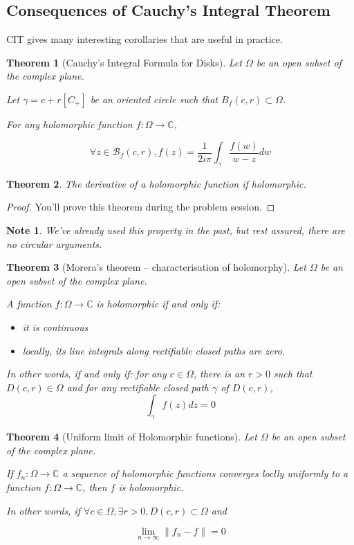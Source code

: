 \documentclass{article}
\newtheorem*{note}{Note}
\newtheorem*{thm*}{Theorem}
\begin{document}
\subsection*{Consequences of Cauchy's Integral Theorem}
CIT gives many interesting corollaries that are useful in practice.


\begin{thm*}[Cauchy's Integral Formula for Disks]
    Let $\Omega$ be an open subset of the complex plane. 

    Let $\gamma = c + r[C_+]$ be an oriented circle such that $B_f(c, r) \subset \Omega$.

    For any holomorphic function $f: \Omega \rightarrow \mathbb{C}$, 

    $$\forall z\in\mathcal{B}_f(c, r), f(z) = \frac{1}{2i\pi}\int_\gamma \frac{f(w)}{w - z}dw$$
\end{thm*}


\begin{thm*}
    The derivative of a holomorphic function if holomorphic.
\end{thm*}

\begin{proof}
    You'll prove this theorem during the problem session.
\end{proof}

\begin{note}
    We've already used this property in the past, but rest assured, there are no circular arguments.
\end{note}

\begin{thm*}[Morera's theorem -- characterisation of holomorphy]
    Let $\Omega$ be an open subset of the complex plane. 

    A function $f: \Omega \rightarrow \mathbb{C}$ is holomorphic if and only if:

    \begin{itemize}
        \item it is continuous
        \item locally, its line integrals along rectifiable closed paths are zero.
    \end{itemize}

    In other words, if and only if: for any $c\in\Omega$, there is an $r > 0$ such that $D(c, r) \in \Omega$ and for any rectifiable closed path $\gamma$ of $D(c,r)$,
    $$\int_\gamma f(z)dz = 0 $$
\end{thm*}

\begin{thm*}[Uniform limit of Holomorphic functions]
    Let $\Omega$ be an open subset of the complex plane. 

    If $f_n: \Omega \rightarrow \mathbb{C}$ a sequence of holomorphic functions converges loclly uniformly to a function $f: \Omega \rightarrow \mathbb{C}$, then $f$ is holomorphic.

    In other words, if $\forall c\in\Omega, \exists r > 0, D(c,r) \subset \Omega$ and 

    $$ \lim_{n\rightarrow \infty}\left\| f_n - f \right \|  = 0$$

\end{thm*}
\end{document}
